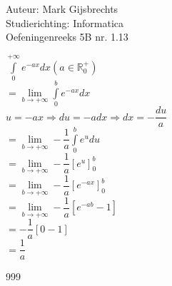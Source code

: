 \documentclass[a4paper]{article}
\newcommand{\dint}{\displaystyle\int}
\begin{document}
\noindent \large Auteur: Mark Gijsbrechts \\
\noindent \large Studierichting: Informatica\\
\noindent \large Oefeningenreeks 5B nr. 1.13\\

\medskip

\normalsize





$ \dint\limits_{0}^{+\infty} e^{-ax} dx  \left( a \in \mathbb{R}_0^{+}  \right) $\\

$= \lim\limits_{b \to +\infty} \dint\limits_{0}^{b} e^{-ax} dx  $ \\

$ u = -ax \Rightarrow du = -a dx \Rightarrow dx = -\dfrac{du}{a}  $ \\

$= \lim\limits_{b \to +\infty} -\dfrac{1}{a} \dint\limits_{0}^{b} e^{u} du  $ \\

$= \lim\limits_{b \to +\infty}  -\dfrac{1}{a} \left[ e^u \right]_{0}^{b}  $ \\

$= \lim\limits_{b \to +\infty}  -\dfrac{1}{a} \left[ e^{-ax} \right]_{0}^{b}  $ \\

$= \lim\limits_{b \to +\infty}  -\dfrac{1}{a} \left[ e^{-ab} - 1 \right]  $ \\

$= -\dfrac{1}{a} \left[ 0 - 1 \right]  $ \\

$= \dfrac{1}{a} $ \\




\begin{thebibliography}{999}
\end{thebibliography}
\end{document}

